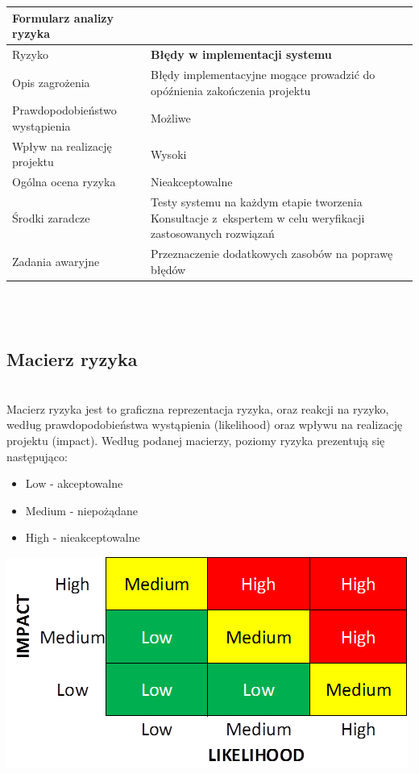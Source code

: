 \documentclass{article}
\begin{document}
\mbox{}\\\mbox{}\\

{\def\arraystretch{1.3}\tabcolsep=10pt
\begin{tabular}{|L{6cm}|L{9cm}|}
\hline
Formularz analizy ryzyka &  \\
\hline
Ryzyko 						   & \textbf{Błędy w implementacji systemu} \\
\hline
Opis zagrożenia				   & Błędy implementacyjne mogące prowadzić do opóźnienia zakończenia projektu \\
\hline
Prawdopodobieństwo wystąpienia & Możliwe \\
\hline
Wpływ na realizację projektu   & Wysoki \\
\hline
Ogólna ocena ryzyka   & Nieakceptowalne \\
\hline
Środki zaradcze				   & Testy systemu na każdym etapie tworzenia
Konsultacje z~ekspertem w celu weryfikacji zastosowanych rozwiązań
 \\
\hline
Zadania awaryjne			   & Przeznaczenie dodatkowych zasobów na poprawę błędów \\
\hline
\end{tabular}}

\mbox{}\\\mbox{}\\
\subsection{Macierz ryzyka}
\mbox{}\\
Macierz ryzyka jest to graficzna reprezentacja ryzyka, oraz reakcji na ryzyko, według prawdopodobieństwa wystąpienia (likelihood) oraz wpływu na realizację projektu (impact).
Według podanej macierzy, poziomy ryzyka prezentują się następująco:
\begin{itemize}
\item Low - akceptowalne
\item Medium - niepożądane
\item High - nieakceptowalne
\end{itemize}

\begin{center}
	\includegraphics[scale=0.8]{Updated-Risk-Matrix.jpg} %
\end{center}
\end{document}
